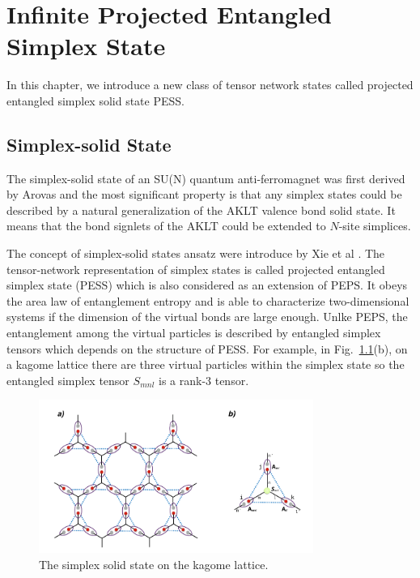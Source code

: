 \chapter{Infinite Projected Entangled Simplex State}
\label{chapter:ipess}
In this chapter, we introduce a new class of tensor network states called projected entangled simplex solid state PESS.
\section{Simplex-solid State}
\label{solidstate}
The simplex-solid state of an SU(N) quantum anti-ferromagnet was first derived by Arovas \cite{PhysRevB.77.104404} and the most significant property is that any simplex states could be described by a natural generalization of the AKLT \cite{PhysRevLett.59.799} \cite{Affleck1988} valence bond solid state. It means that the bond signlets of the AKLT could be extended to $N$-site simplices.

The concept of simplex-solid states ansatz were introduce by Xie et al \cite{PhysRevX.4.011025, PhysRevB.93.075154}. The tensor-network representation of simplex states is called projected entangled simplex state (PESS) which is also considered as an extension of PEPS. It obeys the area law \cite{RevModPhys.82.277} of entanglement entropy and is able to characterize two-dimensional systems if the dimension of the virtual bonds are large enough. Unlke PEPS, the entanglement among the virtual particles is described by entangled simplex tensors which depends on the structure of PESS. For example, in Fig.~\ref{fig411}(b), on a kagome lattice there are three virtual particles within the simplex state so the entangled simplex tensor $S_{mnl}$ is a rank-3 tensor.

\begin{figure}[ht]
	\centering
	\includegraphics[width=0.80\textwidth]{figures/fig411.png}
	\caption[The simplex solid state on the kagome lattice.]{The simplex solid state on the kagome lattice.}
	\label{fig411}
\end{figure}


